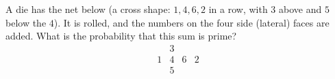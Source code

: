 A die has the net below (a cross shape: $1,4,6,2$ in a row, with $3$ above and $5$ below the $4$). It is rolled, and the numbers on the four side (lateral) faces are added. What is the probability that this sum is prime?
\[\begin{array}{cccc}&3&&\\1&4&6&2\\&5&&\end{array}\]

